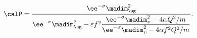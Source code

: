 \begin{equation}
\calP = \dfrac{\ee^{-\sigma} \madim_\ug^2}{\ee^{-\sigma} \madim_\ug^2
- \varepsilon f^2 \dfrac{\ee^{-\sigma} \madim_\upsilon^2 - 4 \alpha
Q^2/m}{\ee^{-\sigma} \madim_\upsilon^2 - 4 \alpha f^2
Q^2/m}}.
\end{equation}

